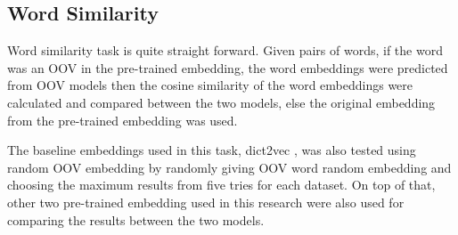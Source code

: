     \subsection{Word Similarity}
        Word similarity task is quite straight forward. Given pairs of
        words, if the word was an OOV in the pre-trained embedding, the
        word embeddings were predicted from OOV models then the cosine
        similarity of the word embeddings were calculated and compared
        between the two models, else the original embedding from the
        pre-trained embedding was used. 

        The baseline embeddings used in this task, dict2vec
        \citep{dict2vect2017tissier}, was also tested using random OOV
        embedding by randomly giving OOV word random embedding and
        choosing the maximum results from five tries for each dataset.
        On top of that, other two pre-trained embedding used in this
        research were also used for comparing the results between the
        two models.